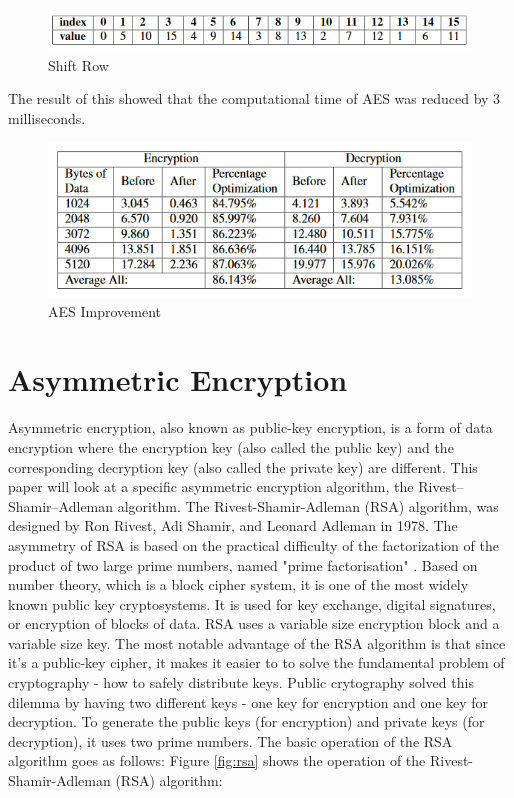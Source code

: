 \documentclass[journal]{IEEEtran}
\begin{document}
\newline
\begin{figure}[!h]
    \centering
    \includegraphics[scale=.5]{shift_row}
    \caption{Shift Row}
    \label{fig:aes_times}
\end{figure}

The result of this showed that the computational time of AES was reduced by 3 milliseconds. 

\newline
\begin{figure}[!h]
    \centering
    \includegraphics[scale=.7]{aes_improvement}
    \caption{AES Improvement}
    \label{fig:aes_times}
\end{figure}

\section{\textbf{Asymmetric Encryption}}
Asymmetric encryption, also known as public-key encryption, is a form of data encryption where the encryption key (also called the public key) and the corresponding decryption key (also called the private key) are different. This paper will look at a specific asymmetric encryption algorithm, the Rivest–Shamir–Adleman algorithm. The Rivest-Shamir-Adleman (RSA) algorithm, was designed by Ron Rivest, Adi Shamir, and Leonard Adleman in 1978. The asymmetry of RSA is based on the practical difficulty of the factorization of the product of two large prime numbers, named "prime factorisation" \cite{prime_factorization}. Based on number theory, which is a block cipher system, it is one of the most widely known public key cryptosystems. It is used for key exchange, digital signatures, or encryption of blocks of data. RSA uses a variable size encryption block and a variable size key. The most notable advantage of the RSA algorithm is that since it's a public-key cipher, it makes it easier to to solve the fundamental problem of cryptography - how to safely distribute keys. Public crytography solved this dilemma by having two different keys - one key for encryption and one key for decryption. To generate the public keys (for encryption) and private keys (for decryption), it uses two prime numbers. The basic operation of the RSA algorithm goes as follows: Figure \ref{fig:rsa} shows the operation of the Rivest-Shamir-Adleman (RSA) algorithm:
\end{document}
